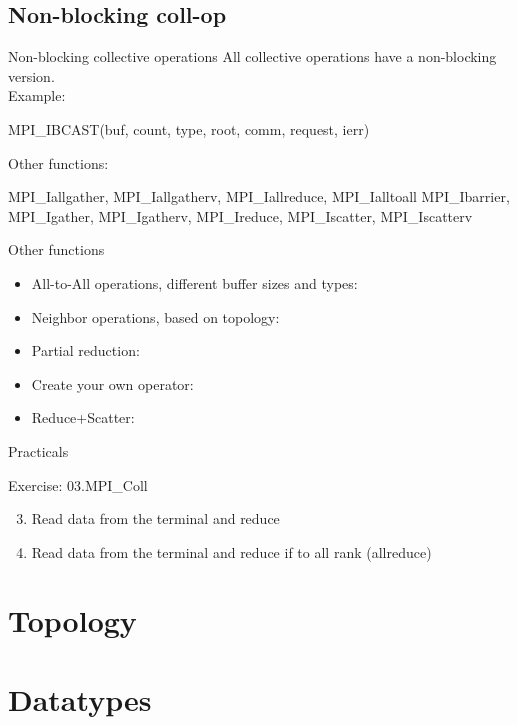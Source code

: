 \documentclass[aspectratio=43]{beamer}
\begin{document}
\subsection{Non-blocking coll-op}
\begin{frame}[fragile]{Non-blocking collective operations}
All collective operations have a non-blocking version.\\
Example:
\begin{Fortranlisting}[]{}
MPI_IBCAST(buf, count, type, root, comm, request, ierr)
\end{Fortranlisting}
Other functions:\\
\begin{Fortranlisting}[]{}
MPI_Iallgather, MPI_Iallgatherv, MPI_Iallreduce, MPI_Ialltoall
MPI_Ibarrier, MPI_Igather, MPI_Igatherv, MPI_Ireduce, MPI_Iscatter, MPI_Iscatterv
\end{Fortranlisting}
\end{frame}

\begin{frame}[fragile]{Other functions}
\begin{itemize}
    \item All-to-All operations, different buffer sizes and types:\\\hspace{1cm}
    \item Neighbor operations, based on topology:\\\hspace{1cm}
    \item Partial reduction:\\\hspace{1cm}
    \item Create your own operator:\\\hspace{1cm}
    \item Reduce+Scatter:\\\hspace{1cm}
\end{itemize}
\end{frame}

\begin{frame}{Practicals}
    \begin{brown2block}{Exercise: 03.MPI\_Coll}
    \begin{enumerate}
        \setcounter{enumi}{2}
        \item Read data from the terminal and reduce
        \item Read data from the terminal and reduce if to all rank (allreduce)
    \end{enumerate}
    \end{brown2block}
\end{frame}

\section{Topology}
\section{Datatypes}

\end{document}

